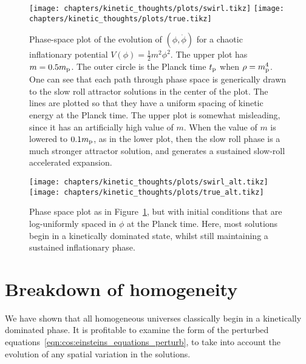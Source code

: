 \begin{figure}[tp]
  \centering
  \texttt{[image: chapters/kinetic\_thoughts/plots/swirl.tikz]}
  \texttt{[image: chapters/kinetic\_thoughts/plots/true.tikz]}
  \caption{Phase-space plot of the evolution of \((\phi,\dot{\phi})\) for a chaotic inflationary potential \(V(\phi) = \frac{1}{2}m^2 \phi^2\). The upper plot has \(m=0.5m_{\mathrm{p}}\). The outer circle is the Planck time \(t_{\mathrm{p}}\) when \(\rho=m_{\mathrm{p}}^4\). One can see that each path through phase space is generically drawn to the slow roll attractor solutions in the center of the plot. The lines are plotted so that they have a uniform spacing of kinetic energy at the Planck time.  The upper plot is somewhat misleading, since it has an artificially high value of \(m\). When the value of \(m\) is lowered to \(0.1m_{\mathrm{p}}\), as in the lower plot, then the slow roll phase is a much stronger attractor solution, and generates a sustained slow-roll accelerated expansion.}\label{fig:kt:linde}
\end{figure}

\begin{figure}[tp]
  \centering
  \texttt{[image: chapters/kinetic\_thoughts/plots/swirl\_alt.tikz]}
  \texttt{[image: chapters/kinetic\_thoughts/plots/true\_alt.tikz]}
  \caption{Phase space plot as in Figure~\protect\ref{fig:kt:linde}, but with initial conditions that are log-uniformly spaced in \(\phi\) at the Planck time. Here, most solutions begin in a kinetically dominated state, whilst still maintaining a sustained inflationary phase.}\label{fig:kt:alternate}
\end{figure}




\section{Breakdown of homogeneity}
We have shown that all homogeneous universes classically begin in a kinetically dominated phase. It is profitable to examine the form of the perturbed equations~\eqref{eqn:cos:einsteins_equations_perturb}, to take into account the evolution of any spatial variation in the solutions.

